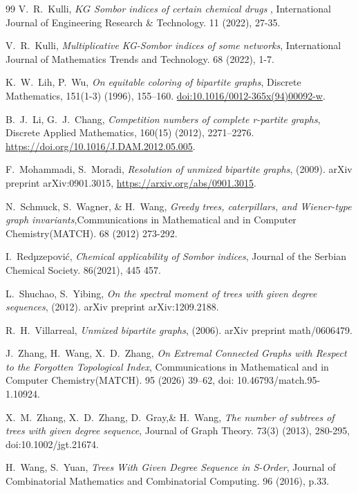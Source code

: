 \documentclass{article}
\theoremstyle{definition}
\begin{document}
\begin{thebibliography}{99}
 V.~R.~Kulli, \emph{$KG$ Sombor indices of certain chemical drugs} , International Journal of Engineering Research \& Technology.  11 (2022), 27-35.

 V.~R.~Kulli, \emph{Multiplicative KG-Sombor indices of some networks}, International Journal of Mathematics Trends and Technology. 68 (2022), 1-7.

 K.~W.~Lih, P.~Wu, \emph{On equitable coloring of bipartite graphs}, Discrete Mathematics, 151(1-3) (1996), 155–160. \url{doi:10.1016/0012-365x(94)00092-w}. 

 B.~J.~Li, G.~J.~Chang, \emph{Competition numbers of complete r-partite graphs}, Discrete Applied Mathematics, 160(15) (2012), 2271–2276. \url{https://doi.org/10.1016/J.DAM.2012.05.005}.

 F.~Mohammadi, S.~Moradi, \emph{Resolution of unmixed bipartite graphs},  (2009). arXiv preprint arXiv:0901.3015, \url{https://arxiv.org/abs/0901.3015}.

 N.~Schmuck, S.~Wagner, \& H.~Wang, \emph{Greedy trees, caterpillars, and Wiener-type graph invariants},Communications in Mathematical and in Computer Chemistry(MATCH). 68 (2012) 273-292.

 I.~Redµzepovi\'c, \emph{Chemical applicability of Sombor indices}, Journal of the Serbian Chemical Society. 86(2021), 445 457.

  L.~Shuchao, S.~Yibing, \emph{On the spectral moment of trees with given degree sequences},  (2012). arXiv preprint arXiv:1209.2188.





 R.~H.~Villarreal, \emph{Unmixed bipartite graphs}, (2006). arXiv preprint math/0606479.

 J.~Zhang, H.~Wang, X.~D.~Zhang, \emph{On Extremal Connected Graphs with Respect to the Forgotten Topological Index}, Communications in Mathematical and in Computer Chemistry(MATCH). 95 (2026) 39–62, doi: 10.46793/match.95-1.10924.

 X.~M.~Zhang, X.~D.~Zhang, D.~Gray,\& H.~Wang, \emph{The number of subtrees of trees with given degree sequence}, Journal of Graph Theory. 73(3) (2013), 280-295, doi:10.1002/jgt.21674.

 H.~Wang, S.~Yuan, \emph{Trees With Given Degree Sequence in S-Order}, Journal of Combinatorial Mathematics and Combinatorial Computing. 96 (2016), p.33.
\end{thebibliography}
 
\end{document}
